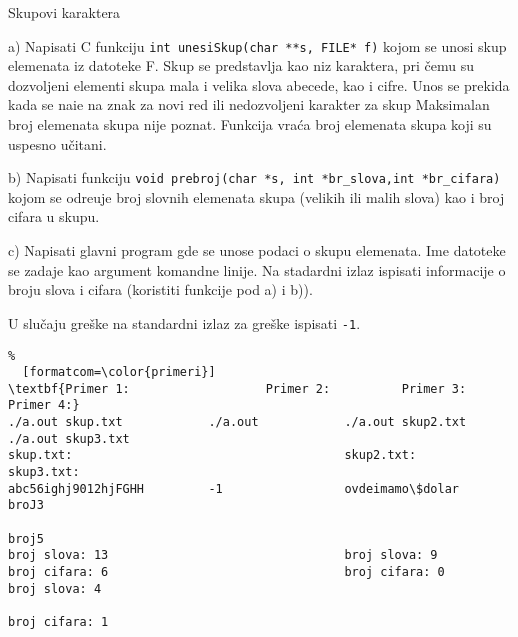 \documentclass{article}
\def\d{{\fontencoding{T1}\selectfont\dj}}
\begin{document}
\begin{z} Skupovi karaktera
\begin{description}
	\item{a)} Napisati C funkciju 
	\verb|int unesiSkup(char **s, FILE* f)|
	kojom se unosi skup elemenata iz datoteke F. Skup se predstavlja kao 
	niz karaktera, pri \v cemu su dozvoljeni elementi skupa mala i velika slova abecede, kao i cifre.
	Unos se prekida kada se nai\d e na znak za novi red ili nedozvoljeni karakter za skup 
	Maksimalan broj elemenata skupa nije poznat.
	Funkcija vra\' ca broj elemenata skupa koji su uspesno u\v citani.
	\item{b)} Napisati funkciju
	\verb|void prebroj(char *s, int *br_slova,int *br_cifara)|
	kojom se odre\d uje broj slovnih elemenata skupa (velikih ili malih slova) 
	kao i broj cifara u skupu.
	\item{c)} Napisati glavni program gde se unose podaci o skupu elemenata. Ime datoteke se zadaje kao argument komandne linije.
	Na stadardni izlaz ispisati informacije o broju slova i cifara (koristiti funkcije pod a) i b)).
      \end{description}
U slučaju greške na standardni izlaz za greške ispisati {\tt -1}. 
\end{z}
\begin{Verbatim}%
  [formatcom=\color{primeri}]
\textbf{Primer 1:                   Primer 2:          Primer 3:                 Primer 4:}
./a.out skup.txt            ./a.out            ./a.out skup2.txt         ./a.out skup3.txt
skup.txt:                                      skup2.txt:                skup3.txt:
abc56ighj9012hjFGHH         -1                 ovdeimamo\$dolar           broJ3
                                                                         broj5
broj slova: 13                                 broj slova: 9
broj cifara: 6                                 broj cifara: 0            broj slova: 4 
                                                                         broj cifara: 1
\end{Verbatim}
\end{document}
